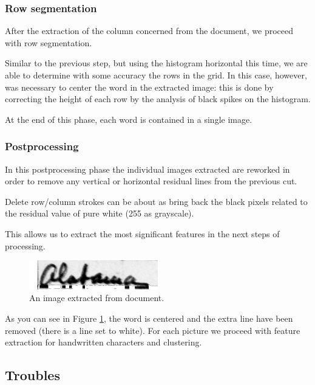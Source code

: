 \documentclass[a4paper,12pt]{article}
\begin{document}
\subsubsection{Row segmentation}

After the extraction of the column concerned from the document, we proceed with row segmentation.

Similar to the previous step, but using the histogram horizontal this time, we are able to determine with some accuracy the rows in the grid. In this case, however, was necessary to center the word in the extracted image: this is done by correcting the height of each row by the analysis of black spikes on the histogram.

At the end of this phase, each word is contained in a single image.

\subsubsection{Postprocessing}

In this postprocessing phase the individual images extracted are reworked in order to remove any  vertical or horizontal residual lines from the previous cut.

Delete row/column strokes can be about as bring back the black pixels related to the residual value of pure white (255 as grayscale).

This allows us to extract the most significant features in the next steps of processing.

\begin{figure}[!ht]
\centering
\vspace{0.3cm}
\includegraphics[width=0.5\textwidth]{images/img2.jpg}
\caption{An image extracted from document.}
\label{fig:extracted_image}
\end{figure}

As you can see in Figure \ref{fig:extracted_image}, the word is centered and the extra line have been removed (there is a line set to white). For each picture we proceed with feature extraction for handwritten characters and clustering. 

\subsection{Troubles}
\end{document}
